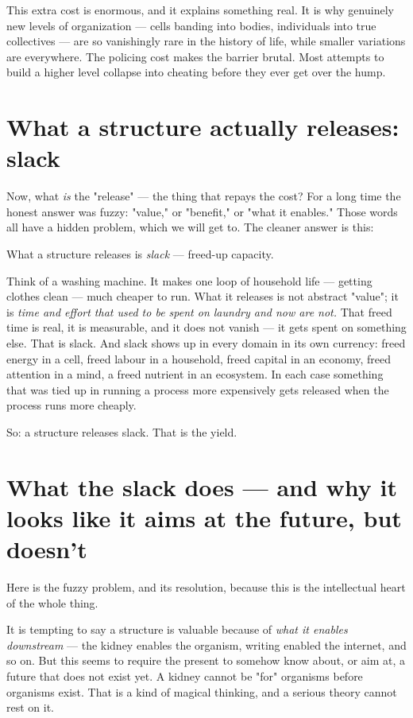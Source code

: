 \documentclass{article}
\begin{document}
This extra cost is enormous, and it explains something real. It is why genuinely new levels of organization --- cells banding into bodies, individuals into true collectives --- are so vanishingly rare in the history of life, while smaller variations are everywhere. The policing cost makes the barrier brutal. Most attempts to build a higher level collapse into cheating before they ever get over the hump.

\section{What a structure actually releases: slack}

Now, what \textit{is} the "release" --- the thing that repays the cost? For a long time the honest answer was fuzzy: "value," or "benefit," or "what it enables." Those words all have a hidden problem, which we will get to. The cleaner answer is this:

What a structure releases is \textit{slack} --- freed-up capacity.

Think of a washing machine. It makes one loop of household life --- getting clothes clean --- much cheaper to run. What it releases is not abstract "value"; it is \textit{time and effort that used to be spent on laundry and now are not.} That freed time is real, it is measurable, and it does not vanish --- it gets spent on something else. That is slack. And slack shows up in every domain in its own currency: freed energy in a cell, freed labour in a household, freed capital in an economy, freed attention in a mind, a freed nutrient in an ecosystem. In each case something that was tied up in running a process more expensively gets released when the process runs more cheaply.

So: a structure releases slack. That is the yield.

\section{What the slack does --- and why it looks like it aims at the future, but doesn't}

Here is the fuzzy problem, and its resolution, because this is the intellectual heart of the whole thing.

It is tempting to say a structure is valuable because of \textit{what it enables downstream} --- the kidney enables the organism, writing enabled the internet, and so on. But this seems to require the present to somehow know about, or aim at, a future that does not exist yet. A kidney cannot be "for" organisms before organisms exist. That is a kind of magical thinking, and a serious theory cannot rest on it.
\end{document}
